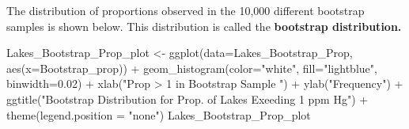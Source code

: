 \documentclass[
  letterpaper,
  DIV=11,
  numbers=noendperiod]{scrreprt}
\newenvironment{Shaded}{\begin{snugshade}}{\end{snugshade}}
\newcommand{\AttributeTok}[1]{\textcolor[rgb]{0.40,0.45,0.13}{#1}}
\newcommand{\CommentTok}[1]{\textcolor[rgb]{0.37,0.37,0.37}{#1}}
\newcommand{\ConstantTok}[1]{\textcolor[rgb]{0.56,0.35,0.01}{#1}}
\newcommand{\ControlFlowTok}[1]{\textcolor[rgb]{0.00,0.23,0.31}{#1}}
\newcommand{\DecValTok}[1]{\textcolor[rgb]{0.68,0.00,0.00}{#1}}
\newcommand{\FloatTok}[1]{\textcolor[rgb]{0.68,0.00,0.00}{#1}}
\newcommand{\FunctionTok}[1]{\textcolor[rgb]{0.28,0.35,0.67}{#1}}
\newcommand{\NormalTok}[1]{\textcolor[rgb]{0.00,0.23,0.31}{#1}}
\newcommand{\OtherTok}[1]{\textcolor[rgb]{0.00,0.23,0.31}{#1}}
\newcommand{\SpecialCharTok}[1]{\textcolor[rgb]{0.37,0.37,0.37}{#1}}
\newcommand{\StringTok}[1]{\textcolor[rgb]{0.13,0.47,0.30}{#1}}
\begin{document}
\begin{Shaded}
\end{Shaded}

The distribution of proportions observed in the 10,000 different
bootstrap samples is shown below. This distribution is called the
\textbf{bootstrap distribution.}

\begin{Shaded}
\begin{Highlighting}[]
\NormalTok{Lakes\_Bootstrap\_Prop\_plot }\OtherTok{\textless{}{-}} \FunctionTok{ggplot}\NormalTok{(}\AttributeTok{data=}\NormalTok{Lakes\_Bootstrap\_Prop, }\FunctionTok{aes}\NormalTok{(}\AttributeTok{x=}\NormalTok{Bootstrap\_prop)) }\SpecialCharTok{+}  
  \FunctionTok{geom\_histogram}\NormalTok{(}\AttributeTok{color=}\StringTok{"white"}\NormalTok{, }\AttributeTok{fill=}\StringTok{"lightblue"}\NormalTok{, }\AttributeTok{binwidth=}\FloatTok{0.02}\NormalTok{) }\SpecialCharTok{+}
  \FunctionTok{xlab}\NormalTok{(}\StringTok{"Prop \textgreater{} 1 in Bootstrap Sample "}\NormalTok{) }\SpecialCharTok{+} \FunctionTok{ylab}\NormalTok{(}\StringTok{"Frequency"}\NormalTok{) }\SpecialCharTok{+}
  \FunctionTok{ggtitle}\NormalTok{(}\StringTok{"Bootstrap Distribution for Prop. of Lakes Exeeding 1 ppm Hg"}\NormalTok{) }\SpecialCharTok{+} 
  \FunctionTok{theme}\NormalTok{(}\AttributeTok{legend.position =} \StringTok{"none"}\NormalTok{)}
\NormalTok{Lakes\_Bootstrap\_Prop\_plot}
\end{Highlighting}
\end{Shaded}
\end{document}
